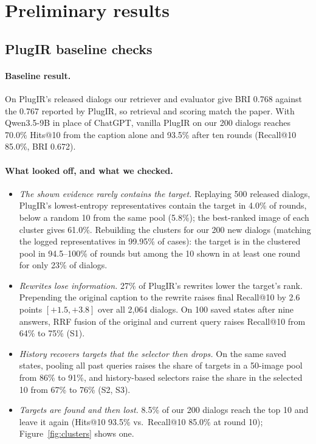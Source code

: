 \documentclass[sigconf,nonacm]{acmart}
\begin{document}
\section{Preliminary results}
\subsection{PlugIR baseline checks}
\label{sec:checks}
\paragraph{Baseline result.} On PlugIR's released dialogs our retriever and evaluator give BRI
0.768 against the 0.767 reported by PlugIR, so retrieval and scoring match the paper. With
Qwen3.5-9B in place of ChatGPT, vanilla PlugIR on our 200 dialogs reaches 70.0\% Hits@10 from the
caption alone and 93.5\% after ten rounds (Recall@10 85.0\%, BRI 0.672).

\paragraph{What looked off, and what we checked.}
\begin{itemize}
\item \emph{The shown evidence rarely contains the target.} Replaying 500 released dialogs, PlugIR's
  lowest-entropy representatives contain the target in 4.0\% of rounds, below a random 10 from the
  same pool (5.8\%); the best-ranked image of each cluster gives 61.0\%. Rebuilding the clusters for
  our 200 new dialogs (matching the logged representatives in 99.95\% of cases): the target is in
  the clustered pool in 94.5--100\% of rounds but among the 10 shown in at least one round for
  only 23\% of dialogs.
\item \emph{Rewrites lose information.} 27\% of PlugIR's rewrites lower the target's rank.
  Prepending the original caption to the rewrite raises final Recall@10 by 2.6 points
  $[+1.5,+3.8]$ over all 2{,}064 dialogs. On 100 saved states after nine answers, RRF fusion of
  the original and current query raises Recall@10 from 64\% to 75\% (S1).
\item \emph{History recovers targets that the selector then drops.} On the same saved states,
  pooling all past queries raises the share of targets in a 50-image pool from 86\% to 91\%, and
  history-based selectors raise the share in the selected 10 from 67\% to 76\% (S2, S3).
\item \emph{Targets are found and then lost.} 8.5\% of our 200 dialogs reach the top 10 and leave
  it again (Hits@10 93.5\% vs.\ Recall@10 85.0\% at round 10); Figure~\ref{fig:clusters} shows one.
\end{itemize}
\end{document}
